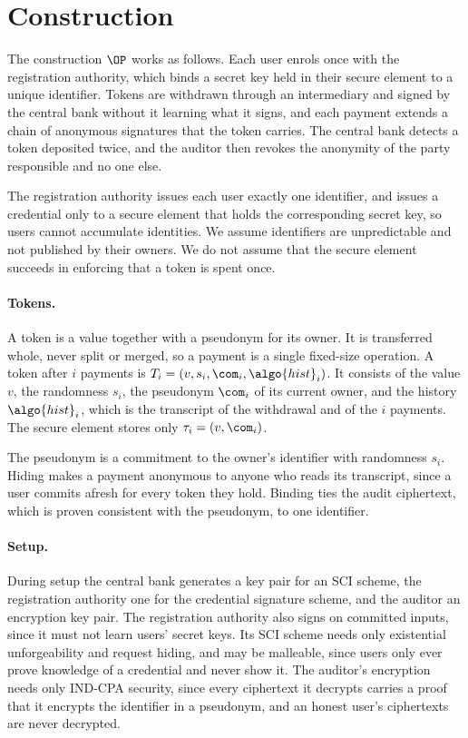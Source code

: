 \section{Construction}\label{sec:offline-construction}

The construction $\OP$ works as follows. Each user enrols once with the
registration authority, which binds a secret key held in their secure element
to a unique identifier. Tokens are withdrawn through an intermediary and signed
by the central bank without it learning what it signs, and each payment extends
a chain of anonymous signatures that the token carries. The central bank
detects a token deposited twice, and the auditor then revokes the anonymity of
the party responsible and no one else.

The registration authority issues each user exactly one identifier, and issues
a credential only to a secure element that holds the corresponding secret key,
so users cannot accumulate identities. We assume identifiers are unpredictable
and not published by their owners. We do not assume that the secure element
succeeds in enforcing that a token is spent once.

\paragraph{Tokens.} A token is a value together with a pseudonym for its owner.
It is transferred whole, never split or merged, so a payment is a single
fixed-size operation. A token after $i$ payments is $T_i = (v, s_i, \com_i,
\algo{hist}_i)$. It consists of the value $v$, the randomness $s_i$, the
pseudonym $\com_i$ of its current owner, and the history $\algo{hist}_i$, which
is the transcript of the withdrawal and of the $i$ payments. The secure element
stores only $\tau_i = (v, \com_i)$.

The pseudonym is a commitment to the owner's identifier with randomness $s_i$.
Hiding makes a payment anonymous to anyone who reads its transcript, since a
user commits afresh for every token they hold. Binding ties the audit
ciphertext, which is proven consistent with the pseudonym, to one identifier.

\paragraph{Setup.} During setup the central bank generates a key pair for an
SCI scheme, the registration authority one for the credential signature scheme,
and the auditor an encryption key pair. The registration authority also signs
on committed inputs, since it must not learn users' secret keys. Its SCI scheme
needs only existential unforgeability and request hiding, and may be malleable,
since users only ever prove knowledge of a credential and never show it. The auditor's encryption needs
only IND-CPA security, since every ciphertext it decrypts carries a proof that
it encrypts the identifier in a pseudonym, and an honest user's ciphertexts are
never decrypted.

